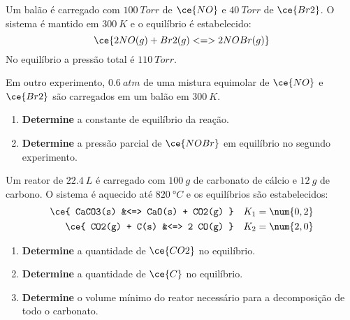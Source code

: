 \begin{problem}[
	id={2F70},
	path={/home/braun/Documents/Developer/braunchem/data/problems/Q2/2F/2F70}
]
Um balão é carregado com {\(\qty{100}{\unit{Torr}}\)} de {\(\ce{NO}\)} e {\(\qty{40}{\unit{Torr}}\)} de {\(\ce{Br2}\)}. O sistema é mantido em
{\(\qty{300}{\unit{K}}\)} e o equilíbrio é estabelecido: {\[
\ce{ 2 NO(g) + Br2(g) <=> 2 NOBr(g) }
\]} No equilíbrio a pressão total é {\(\qty{110}{\unit{Torr}}\)}.

Em outro experimento, {\(\qty{0,6}{\unit{atm}}\)} de uma mistura equimolar de {\(\ce{NO}\)} e {\(\ce{Br2}\)} são carregados em um balão em
{\(\qty{300}{\unit{K}}\)}.

\begin{enumerate}
\def\labelenumi{\alph{enumi}.}
\tightlist
\item
  \textbf{Determine} a constante de equilíbrio da reação.
\item
  \textbf{Determine} a pressão parcial de {\(\ce{NOBr}\)} em equilíbrio no segundo experimento.
\end{enumerate}

\end{problem}


\begin{problem}[
	id={2F71},
	path={/home/braun/Documents/Developer/braunchem/data/problems/Q2/2F/2F71}
]
Um reator de {\(\qty{22,4}{\unit{L}}\)} é carregado com {\(\qty{100}{\unit{g}}\)} de carbonato de cálcio e {\(\qty{12}{\unit{g}}\)} de carbono. O
sistema é aquecido até {\(\qty{820}{\unit{\degree C}}\)} e os equilíbrios são estabelecidos: {\[
\begin{aligned}
    \ce{ CaCO3(s) &<=> CaO(s) + CO2(g) } && K_1 =
\num{0,2} \\
    \ce{ CO2(g) + C(s) &<=> 2 CO(g) } && K_2 =
\num{2,0}
\end{aligned}
\]}

\begin{enumerate}
\def\labelenumi{\alph{enumi}.}
\tightlist
\item
  \textbf{Determine} a quantidade de {\(\ce{CO2}\)} no equilíbrio.
\item
  \textbf{Determine} a quantidade de {\(\ce{C}\)} no equilíbrio.
\item
  \textbf{Determine} o volume mínimo do reator necessário para a decomposição de todo o carbonato.
\end{enumerate}

\end{problem}


